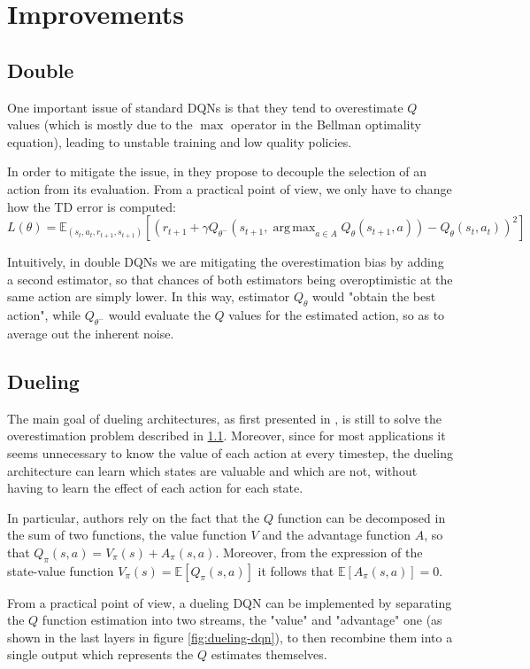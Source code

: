 \documentclass[a4paper,10pt]{report}
\DeclareMathOperator*{\argmax}{arg\,max}
\begin{document}
\section{Improvements}
\subsection{Double}\label{subsec:double-dqn}
One important issue of standard DQNs is that they tend to overestimate $Q$ values (which is mostly due to the $\max$ operator in the Bellman optimality equation), leading to unstable training and low quality policies. 

In order to mitigate the issue, in \cite{double-dqn} they propose to decouple the selection of an action from its evaluation. From a practical point of view, we only have to change how the TD error is computed:
$$
L(\theta)=\mathbb{E}_{(s_t,a_t,r_{t+1},s_{t+1})}\left[\left(r_{t+1}+\gamma Q_{\theta^-}(s_{t+1},\argmax_{a \in A}Q_\theta(s_{t+1},a)) - Q_{\theta}(s_t, a_t)\right)^2\right]
$$

Intuitively, in double DQNs we are mitigating the overestimation bias by adding a second estimator, so that chances of both estimators being overoptimistic at the same action are simply lower. In this way, estimator $Q_{\theta}$ would "obtain the best action", while $Q_{\theta^-}$ would evaluate the $Q$ values for the estimated action, so as to average out the inherent noise.

\subsection{Dueling}
The main goal of dueling architectures, as first presented in \cite{dueling-dqn}, is still to solve the overestimation problem described in \ref{subsec:double-dqn}. Moreover, since for most applications it seems unnecessary to know the value of each action at every timestep, the dueling architecture can learn which states are valuable and which are not, without having to learn the effect of each action for each state.

In particular, authors rely on the fact that the $Q$ function can be decomposed in the sum of two functions, the value function $V$ and the advantage function $A$, so that $Q_\pi(s,a)=V_\pi(s)+A_\pi(s,a)$. Moreover, from the expression of the state-value function $V_\pi(s)=\mathbb{E}\left[Q_\pi\left(s,a\right)\right]$ it follows that $\mathbb{E}\left[A_\pi\left(s,a\right)\right]=0$.

From a practical point of view, a dueling DQN can be implemented by separating the $Q$ function estimation into two streams, the "value" and "advantage" one (as shown in the last layers in figure \ref{fig:dueling-dqn}), to then recombine them into a single output which represents the $Q$ estimates themselves.
\end{document}
